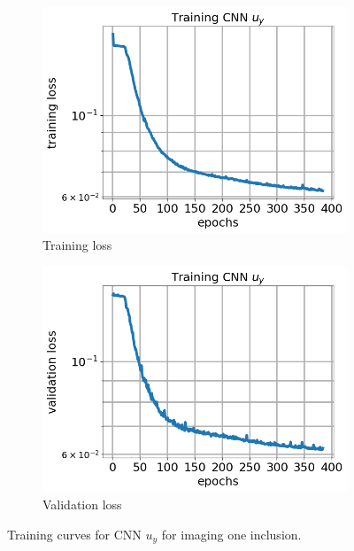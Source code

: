 \documentclass[12pt]{article}
\newcommand{\nhgfigheight}{4.0cm}
\begin{document}
\begin{figure}[h]
  \centering
  \begin{subfigure}[b]{0.45\linewidth}
    \includegraphics[totalheight=\nhgfigheight]{Figures/final1/training/uy/field_imagesy_plot_loss.png}
    \caption{Training loss}
  \end{subfigure}
  \begin{subfigure}[b]{0.45\linewidth}
    \includegraphics[totalheight=\nhgfigheight]{Figures/final1/training/uy/field_imagesy_plot_val_loss.png}
    \caption{Validation loss}
  \end{subfigure}
  \caption{\label{fig:oneinc:trainuy} Training curves for CNN $u_y$ for imaging one inclusion.}
\end{figure}
\end{document}
